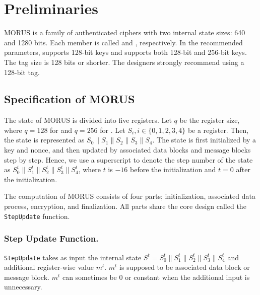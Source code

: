 \section{Preliminaries}
\label{sec/Preliminaries}

MORUS \cite{MORUS} is a family of authenticated ciphers with two internal state sizes: 640 and 1280 bits. Each member is called  and , respectively. In the recommended parameters,  supports 128-bit keys and  supports both 128-bit and 256-bit keys. The tag size is 128 bits or shorter. The designers strongly recommend using a 128-bit tag.

\subsection{Specification of MORUS}
\label{subsec/Spec}
The state of MORUS is divided into five registers. Let $q$ be the register size, where $q = 128$ for  and $q=256$ for . Let $S_i, i \in\{0,1,2,3,4\}$ be a register. Then, the state is represented as $S_0\|S_1\|S_2\|S_3\|S_4$. The state is first initialized by a key and nonce, and then updated by associated data blocks and message blocks step by step. Hence, we use a superscript to denote the step number of the state as $S^t_0\|S^t_1\|S^t_2\|S^t_3\|S^t_4$, where $t$ is $-16$ before the initialization and $t=0$ after the initialization.

The computation of MORUS consists of four parts; initialization, associated data process, encryption, and finalization. All parts share the core design called the {\tt StepUpdate} function. %

\subsubsection{Step Update Function.}
{\tt StepUpdate} takes as input the internal state $S^t = S^t_0\|S^t_1\|S^t_2\|S^t_3\|S^t_4$ and additional register-wise value $m^t$. $m^t$ is supposed to be associated data block or message block. $m^t$ can sometimes be 0 or constant when the additional input is unnecessary.

